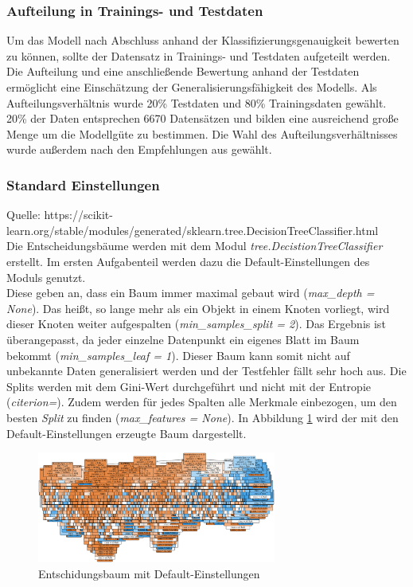 \subsubsection{Aufteilung in Trainings- und Testdaten}
Um das Modell nach Abschluss anhand der Klassifizierungsgenauigkeit bewerten zu können, sollte der Datensatz in Trainings- und Testdaten aufgeteilt werden. Die Aufteilung und eine anschließende Bewertung anhand der Testdaten ermöglicht eine Einschätzung der Generalisierungsfähigkeit des Modells. Als Aufteilungsverhältnis wurde 20\% Testdaten und 80\% Trainingsdaten gewählt. 20\% der Daten entsprechen 6670 Datensätzen und bilden eine ausreichend große Menge um die Modellgüte zu bestimmen. Die Wahl des Aufteilungsverhältnisses wurde außerdem nach den Empfehlungen aus \cite{geron2017hands-on} gewählt.

\subsubsection{Standard Einstellungen}
Quelle: https://scikit-learn.org/stable/modules/generated/sklearn.tree.DecisionTreeClassifier.html\\
Die Entscheidungsbäume werden mit dem Modul \emph{tree.DecistionTreeClassifier} erstellt. Im ersten Aufgabenteil werden dazu die Default-Einstellungen des Moduls genutzt.\\
\noindent \hspace*{7mm}
Diese geben an, dass ein Baum immer maximal gebaut wird (\emph{max\_depth = None}). Das heißt, so lange mehr als ein Objekt in einem Knoten vorliegt, wird dieser Knoten weiter aufgespalten (\emph{min\_samples\_split = 2}). Das Ergebnis ist überangepasst, da jeder einzelne Datenpunkt ein eigenes Blatt im Baum bekommt (\emph{min\_samples\_leaf = 1}). Dieser Baum kann somit nicht auf unbekannte Daten generalisiert werden und der Testfehler fällt sehr hoch aus. Die Splits werden mit dem Gini-Wert durchgeführt und nicht mit der Entropie (\emph{citerion=}). Zudem werden für jedes Spalten alle Merkmale einbezogen, um den besten \emph{Split} zu finden (\emph{max\_features = None}). In Abbildung \ref{fig:treedefault} wird der mit den Default-Einstellungen erzeugte Baum dargestellt.
\begin{figure}[h]
	\centering
	\includegraphics[width = 0.7\textwidth]{Bilder/treedefault}
	\caption{Entschidungsbaum mit Default-Einstellungen}
	\label{fig:treedefault}
\end{figure}
